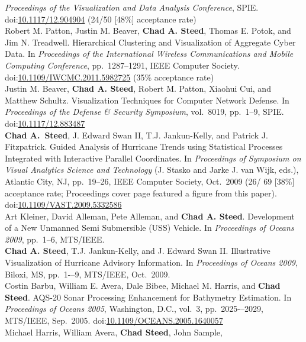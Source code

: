 \documentclass[11pt, letterpaper]{article}
\newcommand{\amper}{{\fontspec[Scale=.95]{Hoefler Text}\selectfont\itshape\&}}
\newcommand{\years}[1]{\marginnote{\scriptsize #1}}
\begin{document}
\begin{sloppypar}
\emph{Proceedings of the Visualization and Data Analysis Conference}, SPIE.
doi:\href{http://dx.doi.org/10.1117/12.904904}{10.1117/12.904904} (24/50 [48\%] acceptance rate)\\
\years{2011}Robert M. Patton, Justin M. Beaver, \textbf{Chad A. Steed},
Thomas E. Potok, and Jim N. Treadwell. Hierarchical Clustering and
Visualization of Aggregate Cyber Data. In \emph{Proceedings of the International
Wireless Communications and Mobile Computing Conference}, pp.\ 1287--1291,
IEEE Computer Society. doi:\href{http://dx.doi.org/10.1109/IWCMC.2011.5982725}
{10.1109/IWCMC.2011.5982725} (35\% acceptance rate)\\
\years{2011}Justin M. Beaver, \textbf{Chad A. Steed}, Robert M. Patton,
Xiaohui Cui, and Matthew Schultz. Visualization Techniques for Computer
Network Defense. In \emph{Proceedings of the Defense \amper{} Security
Symposium}, vol.\ 8019, pp.\ 1--9, SPIE.
doi:\href{http://dx.doi.org/10.1117/12.883487} {10.1117/12.883487}\\
\years{2009}\textbf{Chad A.~Steed}, J. Edward Swan II, T.J. Jankun-Kelly,
and Patrick J. Fitzpatrick. Guided Analysis of Hurricane Trends using
Statistical Processes Integrated with Interactive Parallel Coordinates.  In
\emph{Proceedings of Symposium on Visual Analytics Science and Technology}
(J. Stasko and Jarke J. van Wijk, eds.), Atlantic City, NJ, pp.\ 19--26, IEEE
Computer Society, Oct.\ 2009 (26/ 69 [38\%] acceptance rate; Proceedings
cover page featured a figure from this paper).
doi:\href{http://dx.doi.org/10.1109/VAST.2009.5332586}
{10.1109/VAST.2009.5332586}\\
\years{2009}Art Kleiner, David Alleman, Pete Alleman, and
\textbf{Chad A. Steed}.  Development of a New Unmanned Semi Submersible (USS)
Vehicle. In \emph{Proceedings of Oceans 2009}, pp.\ 1--6, MTS/IEEE.\\
\years{2009}\textbf{Chad A. Steed}, T.J. Jankun-Kelly,  and J. Edward Swan
II. Illustrative Visualization of Hurricane Advisory Information. In
\emph{Proceedings of Oceans 2009}, Biloxi, MS, pp.\ 1-–9, MTS/IEEE, Oct.\ 2009.\\
\years{2005}Costin Barbu, William E. Avera, Dale Bibee, Michael M. Harris,
and \textbf{Chad Steed}. AQS-20 Sonar Processing Enhancement for Bathymetry
Estimation.  In \emph{Proceedings of Oceans 2005}, Washington, D.C., vol.\ 3,
pp.\ 2025-–2029, MTS/IEEE, Sep.\ 2005.
doi:\href{http://dx.doi.org/10.1109/OCEANS.2005.1640057}
{10.1109/OCEANS.2005.1640057}\\
\years{2005}Michael Harris, William Avera, \textbf{Chad Steed}, John Sample,

\end{sloppypar}
\end{document}
